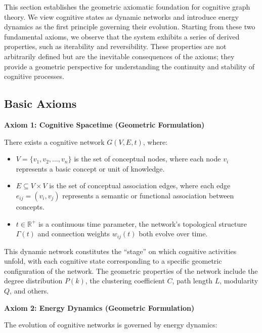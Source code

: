 \documentclass[10pt,onecolumn]{article}
\begin{document}
This section establishes the geometric axiomatic foundation for cognitive graph theory. We view cognitive states as dynamic networks and introduce energy dynamics as the first principle governing their evolution. Starting from these two fundamental axioms, we observe that the system exhibits a series of derived properties, such as iterability and reversibility. These properties are not arbitrarily defined but are the inevitable consequences of the axioms; they provide a geometric perspective for understanding the continuity and stability of cognitive processes.

\subsection{Basic Axioms}

\textbf{Axiom 1: Cognitive Spacetime (Geometric Formulation)}

There exists a cognitive network $G(V, E, t)$, where:
\begin{itemize}
    \item $V = \{v_1, v_2, \ldots, v_n\}$ is the set of conceptual nodes, where each node $v_i$ represents a basic concept or unit of knowledge.
    \item $E \subseteq V \times V$ is the set of conceptual association edges, where each edge $e_{ij} = (v_i, v_j)$ represents a semantic or functional association between concepts.
    \item $t \in \mathbb{R}^+$ is a continuous time parameter, the network’s topological structure $\Gamma(t)$ and connection weights $w_{ij}(t)$ both evolve over time.
\end{itemize}

This dynamic network constitutes the “stage” on which cognitive activities unfold, with each cognitive state corresponding to a specific geometric configuration of the network. The geometric properties of the network include the degree distribution $P(k)$, the clustering coefficient $C$, path length $L$, modularity $Q$, and others.

\textbf{Axiom 2: Energy Dynamics (Geometric Formulation)}

The evolution of cognitive networks is governed by energy dynamics:
\end{document}
